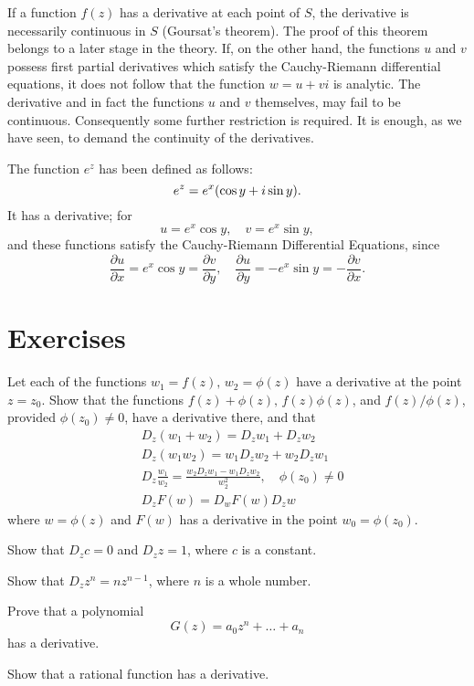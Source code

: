 \documentclass[twosided]{memoir}
\begin{document}
\begin{remark}
	If a function $f(z)$ has a derivative at each point of $S$, the derivative is necessarily continuous in $S$ (Goursat's theorem). The proof of this theorem belongs to a later stage in the theory. If, on the other hand, the functions $u$ and $v$ possess first partial derivatives which satisfy the Cauchy-Riemann differential equations, it does not follow that the function $w=u+vi$ is analytic. The derivative and in fact the functions $u$ and $v$ themselves, may fail to be continuous. Consequently some further restriction is required. It is enough, as we have seen, to demand the continuity of the derivatives.
\end{remark} 

\begin{example}
The function $e^z$ has been defined as follows:
\[
	e^{z}=e^x\pbr*{\cos y+i\sin y} 
.\] It has a derivative; for
\[
u=e^x\cos y, \quad v=e^x\sin y
,\] and these functions satisfy the Cauchy-Riemann Differential Equations, since
\[
\frac{\partial u}{\partial x} =e^x\cos y= \frac{\partial v}{\partial y} , \quad \frac{\partial u}{\partial y} =-e^x\sin y= -\frac{\partial v}{\partial x} 
.\] 
\end{example} 

\section*{Exercises}
\problem Let each of the functions $w_1=f(z), \, w_2=\phi (z)$ have a derivative at the point $z=z_0$. Show that the functions $f(z)+\phi (z), \, f(z)\phi (z)$, and $f(z) / \phi (z)$, provided $\phi (z_0)\neq 0$, have a derivative there, and that
\begin{align*}
	&D_z(w_1+w_2)=D_zw_1+D_zw_2\\
	&D_z(w_1w_2)=w_1D_zw_2+w_2D_zw_1\\
	&D_z \frac{w_1}{w_2}=\frac{w_2D_zw_1-w_1D_zw_2}{w_2^2}, \quad \phi (z_0)\neq 0\\
	&D_zF(w)=D_wF(w)D_zw
\end{align*} where $w=\phi (z)$ and $F(w)$ has a derivative in the point $w_0=\phi (z_0)$.

\problem Show that $D_zc=0$ and $D_z z=1$, where $c$ is a constant.

\problem Show that $D_z z^n=nz^{n-1}$, where $n$ is a whole number.

\problem Prove that a polynomial
\[
	G(z)=a_0z^n+\dots +a_n
\] has a derivative.

\problem Show that a rational function has a derivative. 
\end{document}
